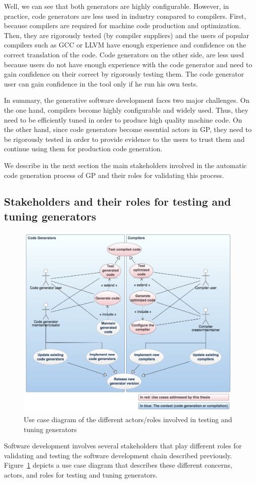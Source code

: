 Well, we can see that both generators are highly configurable. However, in practice, code generators are less used in industry compared to compilers. First, because compilers are required for machine code production and optimization. Then, they are rigorously tested (by compiler suppliers) and the users of popular compilers such as GCC or LLVM have enough experience and confidence on the correct translation of the code. 
Code generators on the other side, are less used because users do not have enough experience with the code generator and need to gain confidence on their correct  by rigorously testing them. The code generator user can gain confidence in the tool only if he run his own tests.

In summary, the generative software development faces two major challenges. On the one hand, compilers become highly configurable and widely used. Thus, they need to be efficiently tuned in order to produce high quality machine code. On the other hand, since code generators become essential actors in GP, they need to be rigorously tested in order to provide evidence to the users to trust them and continue using them for production code generation.

We describe in the next section the main stakeholders involved in the automatic code generation process of GP and their roles for validating this process.


\subsection{Stakeholders and their roles for testing and tuning generators}
\begin{figure}[h]
	\center
	\includegraphics[scale=0.45]{Background/fig/usecase}
	\caption{Use case diagram of the different actors/roles involved in testing and tuning generators}
	\label{fig:usecase}
\end{figure}
Software development involves several stakeholders that play different roles for validating and testing the software development chain described previously.
Figure~\ref{fig:usecase} depicts a use case diagram that describes these different concerns, actors, and roles for testing and tuning generators.


